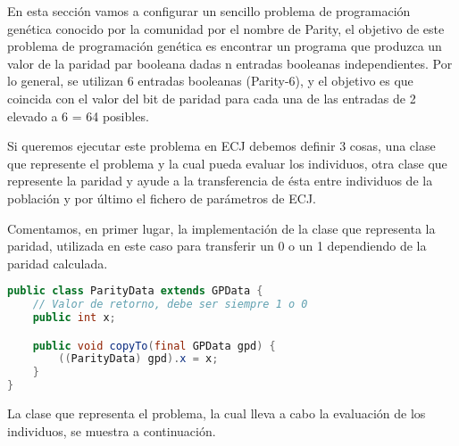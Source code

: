 \label{desarrollo-parity}
En esta sección vamos a configurar un sencillo problema de programación genética conocido por la comunidad por el nombre de Parity, el objetivo de este problema de programación genética es encontrar un programa que produzca un valor de la paridad par booleana dadas n entradas booleanas independientes. Por lo general, se utilizan 6 entradas booleanas (Parity-6), y el objetivo es que coincida con el valor del bit de paridad para cada una de las entradas de 2 elevado a 6 = 64 posibles.

Si queremos ejecutar este problema en ECJ debemos definir 3 cosas, una clase que represente el problema y la cual pueda evaluar los individuos, otra clase que represente la paridad y ayude a la transferencia de \'esta entre individuos de la población y por \'ultimo el fichero de par\'ametros de ECJ.

Comentamos, en primer lugar, la implementación de la clase que representa la paridad, utilizada en este caso para transferir un 0 o un 1 dependiendo de la paridad calculada.

\begin{lstlisting}[language=Java]
public class ParityData extends GPData {
	// Valor de retorno, debe ser siempre 1 o 0
	public int x;

	public void copyTo(final GPData gpd) {
		((ParityData) gpd).x = x;
	}
}
\end{lstlisting}

La clase que representa el problema, la cual lleva a cabo la evaluaci\'on de los individuos, se muestra a continuación.

